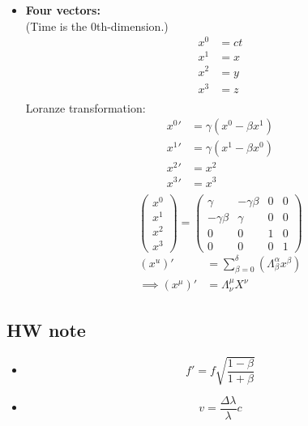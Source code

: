 \documentclass[fleqn,a4paper,12pt]{article}
\begin{document}
\begin{itemize}
    \begin{itemize}
    \item 
      \textbf{Four vectors:}\\
      (Time is the 0th-dimension.)
      \begin{align*}
        x^0  &= ct \\
        x^1 &= x  \\
        x^2 &= y \\
        x^3 &= z \\
      \end{align*}
      Loranze transformation:
      \begin{align*}
        {x^0}' &= \gamma ( x^0 - \beta x^1 ) \\
        {x^1}' &= \gamma (x^1 - \beta x^0 )  \\
        {x^2}' &= x^2 \\
        {x^3}' &= x^3 \\
      \end{align*}
\[
      \begin{pmatrix}
        x^0\\
        x^1\\
        x^2\\
        x^3
      \end{pmatrix}=
      \begin{pmatrix}
        \gamma & -\gamma \beta & 0 & 0\\
        -\gamma \beta & \gamma & 0 & 0\\
        0 & 0 & 1 & 0\\
        0 & 0 & 0 & 1 
      \end{pmatrix}
\]
      \begin{align*}
        (x^u)' &= \sum_{\beta = 0 }^{\delta} ( \Lambda ^{\alpha}_{\beta} x^{\beta} )\\
        \implies (x^\mu)' &= \Lambda ^{\mu}_{\nu} X^{\nu}
      \end{align*}

    \end{itemize}

\end{itemize}

\subsection{HW note}
\begin{itemize}
  \item
    \[  f' = f \sqrt{ \frac{ 1 - \beta }{ 1 + \beta } } \]
  \item
    \[ v = \frac {\Delta \lambda }{ \lambda } c \]


\end{itemize}
\end{document}
